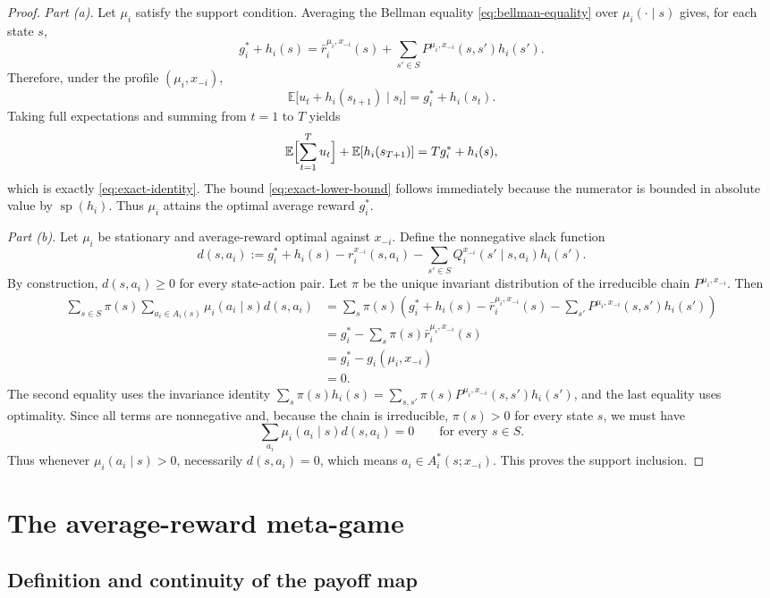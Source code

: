 \documentclass[11pt]{article}
\theoremstyle{definition}
\newcommand{\E}{\mathbb{E}}
\newcommand{\1}{\mathbf{1}}
\DeclareMathOperator{\spn}{sp}
\begin{document}
\begin{proof}
\textit{Part (a).} Let $\mu_i$ satisfy the support condition. Averaging the Bellman equality \eqref{eq:bellman-equality} over $\mu_i(\cdot\mid s)$ gives, for each state $s$,
\[
g_i^*+h_i(s)
=\bar r_i^{\mu_i,x_{-i}}(s)+\sum_{s'\in S}P^{\mu_i,x_{-i}}(s,s')h_i(s').
\]
Therefore, under the profile $(\mu_i,x_{-i})$,
\[
\E\bigl[u_t+h_i(s_{t+1})\mid s_t\bigr]=g_i^*+h_i(s_t).
\]
Taking full expectations and summing from $t=1$ to $T$ yields
\[
\E\Bigl[\sum_{t=1}^{T}u_t\Bigr]+\E[h_i(s_{T+1})]=Tg_i^*+h_i(s),
\]
which is exactly \eqref{eq:exact-identity}. The bound \eqref{eq:exact-lower-bound} follows immediately because the numerator is bounded in absolute value by $\spn(h_i)$. Thus $\mu_i$ attains the optimal average reward $g_i^*$.

\smallskip
\noindent
\textit{Part (b).} Let $\mu_i$ be stationary and average-reward optimal against $x_{-i}$. Define the nonnegative slack function
\[
d(s,a_i):=g_i^*+h_i(s)-r_i^{x_{-i}}(s,a_i)-\sum_{s'\in S}Q_i^{x_{-i}}(s'\mid s,a_i)h_i(s').
\]
By construction, $d(s,a_i)\ge0$ for every state-action pair. Let $\pi$ be the unique invariant distribution of the irreducible chain $P^{\mu_i,x_{-i}}$. Then
\begin{align*}
\sum_{s\in S}\pi(s)\sum_{a_i\in A_i(s)}\mu_i(a_i\mid s)d(s,a_i)
&=\sum_{s}\pi(s)\left(g_i^*+h_i(s)-\bar r_i^{\mu_i,x_{-i}}(s)-\sum_{s'}P^{\mu_i,x_{-i}}(s,s')h_i(s')\right)\\
&=g_i^*-\sum_s\pi(s)\bar r_i^{\mu_i,x_{-i}}(s)\\
&=g_i^*-g_i(\mu_i,x_{-i})\\
&=0.
\end{align*}
The second equality uses the invariance identity $\sum_s\pi(s)h_i(s)=\sum_{s,s'}\pi(s)P^{\mu_i,x_{-i}}(s,s')h_i(s')$, and the last equality uses optimality. Since all terms are nonnegative and, because the chain is irreducible, $\pi(s)>0$ for every state $s$, we must have
\[
\sum_{a_i}\mu_i(a_i\mid s)d(s,a_i)=0\qquad\text{for every }s\in S.
\]
Thus whenever $\mu_i(a_i\mid s)>0$, necessarily $d(s,a_i)=0$, which means $a_i\in A_i^*(s;x_{-i})$. This proves the support inclusion.
\end{proof}

\section{The average-reward meta-game}\label{sec:metagame}

\subsection{Definition and continuity of the payoff map}
\end{document}

